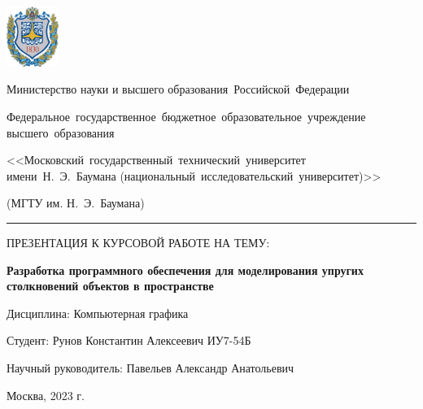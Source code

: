 \documentclass{beamer}
\begin{document}
\begingroup
{}
\begin{frame}
\begin{center}
    \begin{minipage}{0.1\textwidth}
        \includegraphics[width=1.7cm]{img/bmstu_logo.jpg}
    \end{minipage}
    \hfill
    \begin{minipage}{0.80\textwidth}\centering
        {
            \linespread{1}\selectfont\tiny
            {Министерство науки и высшего образования~Российской~Федерации}

            {Федеральное~государственное~бюджетное~образовательное~учреждение высшего~образования}

            {<<Московский~государственный~технический~университет имени~Н.~Э.~Баумана (национальный~исследовательский~университет)>>}

            {(МГТУ им. Н.~Э.~Баумана)}
        }
    \end{minipage}
\end{center}
\rule[3ex]{\linewidth}{1pt}

\begin{center}
    ПРЕЗЕНТАЦИЯ К КУРСОВОЙ РАБОТЕ НА ТЕМУ:
\end{center}

\vfill

\begin{center}
\textbf{Разработка программного обеспечения для моделирования упругих столкновений объектов в пространстве}
\end{center}

\vfill

Дисциплина: Компьютерная графика

Студент: Рунов Константин Алексеевич ИУ7-54Б

Научный руководитель: Павельев Александр Анатольевич

\vfill

\centering
Москва, 2023 г.
\end{frame}
\endgroup

\end{document}
